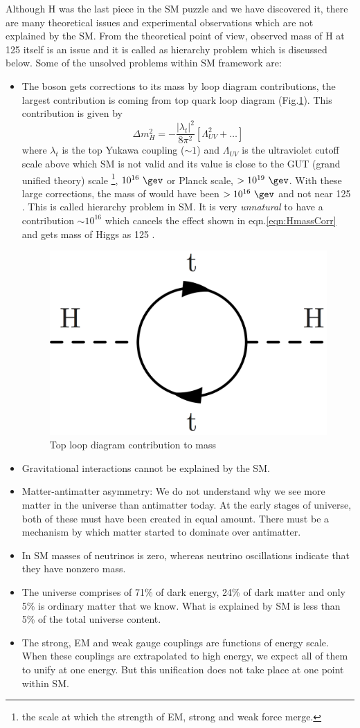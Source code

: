 Although H was the last piece in the SM puzzle and we have discovered it, there are many theoretical issues and experimental observations
which are not explained by the SM. From the theoretical point of view, observed mass of H at 125 \gev itself is an issue and it is called as 
hierarchy problem which is discussed below. Some of the unsolved problems within SM framework are:
\begin{itemize}
\item The \higgs boson gets corrections to its mass by loop diagram contributions, the largest contribution is coming from top quark loop 
diagram (Fig.\ref{fig:hierarchy_problem_higgs}). This contribution is given by
\begin{equation}
\Delta m_{H}^2 = -\frac{|\lambda_t|^2}{8\pi^2}[\Lambda_{UV}^2 + \dots]
\label{eqn:HmassCorr}
\end{equation}
where $\lambda_t$ is the top Yukawa coupling ($\sim 1$) and $\Lambda_{UV}$ is the ultraviolet cutoff scale above which SM is not valid and 
its value is close to the GUT (grand unified theory) scale \footnote{the scale at which the strength of EM, strong and weak force merge.}, 
$10^{16}\ \gev$ or Planck scale, $> 10^{19}\ \gev$. With these large corrections, the mass of \higgs would have been $> 10^{16}\ \gev$ and 
not near 125 \gev. This is called hierarchy problem in SM. It is very \textit{unnatural} to have a contribution $\sim 10^{16}$ \gev which 
cancels the effect shown in eqn.\ref{eqn:HmassCorr} and gets mass of Higgs as 125 \gev.
\begin{figure}[h!]
\centering
\includegraphics[width=0.35\linewidth]{../Figures/Chap1/hierarchy_problem_higgs.png}
\caption{Top loop diagram contribution to \higgs mass}
\label{fig:hierarchy_problem_higgs}
\end{figure}
\item Gravitational interactions cannot be explained by the SM.
\item Matter-antimatter asymmetry: We do not understand why we see more matter in the universe than antimatter today. At the early stages 
of universe, both of these must have been created in equal amount. There must be a mechanism by which matter started to dominate over 
antimatter.
\item In SM masses of neutrinos is zero, whereas neutrino oscillations \cite{Fukuda:1998mi} indicate that they have nonzero mass.
\item The universe comprises of 71\% of dark energy, 24\% of dark matter and only 5\% is ordinary matter that we know. What is 
explained by SM is less than 5\% of the total universe content.
\item The strong, EM and weak gauge couplings are functions of energy scale. When these couplings are extrapolated to high energy, we 
expect all of them to unify at one energy. But this unification does not take place at one point within SM.
\end{itemize}

